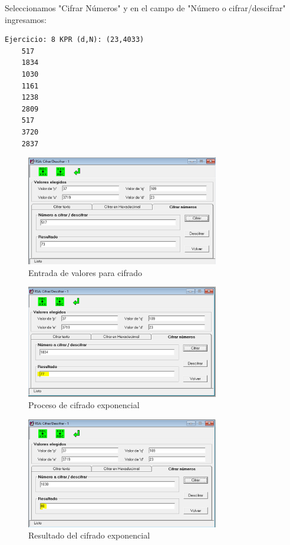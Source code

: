 \FloatBarrier

Seleccionamos "Cifrar Números" y en el campo de "Número o cifrar/descifrar" ingresamos:

\begin{lstlisting}[caption={Ejercicio de Cálculo}, label=lst:exercise]
Ejercicio: 8 KPR (d,N): (23,4033)
	517
	1834
	1030
	1161
	1238
	2809
	517
	3720
	2837
\end{lstlisting}
	
\begin{figure}[H]
	\centering
	\includegraphics[width=0.75\textwidth]{./assets/img10.png}
	\caption{Entrada de valores para cifrado}
	\label{fig:cipher-input}
\end{figure}

\begin{figure}[H]
	\centering
	\includegraphics[width=0.75\textwidth]{./assets/img11.png}
	\caption{Proceso de cifrado exponencial}
	\label{fig:expo-cipher-process}
\end{figure}

\begin{figure}[H]
	\centering
	\includegraphics[width=0.75\textwidth]{./assets/img12.png}
	\caption{Resultado del cifrado exponencial}
	\label{fig:expo-cipher-result}
\end{figure}

